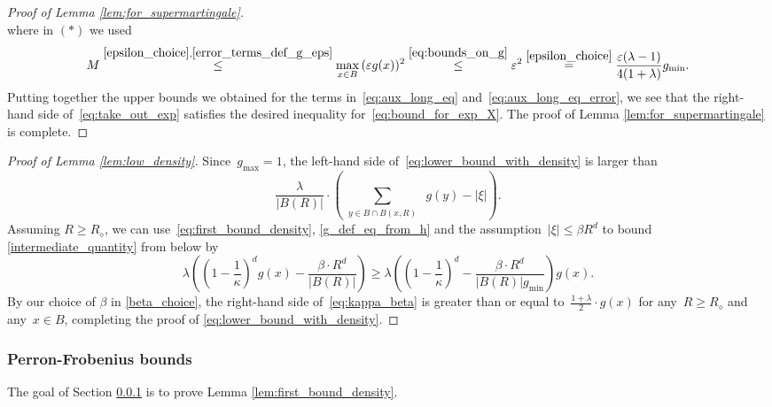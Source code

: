 \documentclass[a4paper,12pt]{article}
\begin{document}
\begin{proof}[Proof of Lemma \ref{lem:for_supermartingale}]
\begin{equation}
\end{equation}
where in  $(*)$ we used
\begin{equation*}
 M \stackrel{\eqref{epsilon_choice}, \eqref{error_terms_def_g_eps} }{\leq} \max_{x \in B}\, ( \varepsilon g(x) )^2 \stackrel{\eqref{eq:bounds_on_g} }{\leq} \varepsilon^2
 \stackrel{\eqref{epsilon_choice}}{=} \frac{\varepsilon(\lambda-1)}{4(1+\lambda)}g_{\min}.
\end{equation*}
Putting together the upper bounds  we obtained for the terms in~\eqref{eq:aux_long_eq} and~\eqref{eq:aux_long_eq_error}, we see that the right-hand side of~\eqref{eq:take_out_exp}  satisfies the desired inequality for~\eqref{eq:bound_for_exp_X}.
The proof of Lemma \ref{lem:for_supermartingale} is complete.
\end{proof}



\begin{proof}[Proof of Lemma \ref{lem:low_density}]
Since~$g_{\max}= 1$, the left-hand side of~\eqref{eq:lower_bound_with_density} is larger than
\begin{equation}\label{intermediate_quantity}
\frac{\lambda}{|B(R)|}\cdot \left( \sum_{\substack{y \in B \cap B(x,R)}}\;  g(y) - |\xi| \right).
\end{equation}
Assuming $R \ge R_\diamond$, we can use~\eqref{eq:first_bound_density}, \eqref{g_def_eq_from_h} and the assumption~$|\xi| \leq \beta R^d$ to bound \eqref{intermediate_quantity} from below by
\begin{equation} \label{eq:kappa_beta}
\lambda \left(\left(1-\frac{1}{\kappa}\right)^d  g(x) - \frac{ \beta \cdot R^d}{|B(R)|} \right) \geq \lambda \left(\left(1- \frac{1}{\kappa}\right)^d - \frac{\beta \cdot R^d}{|B(R)|  g_{\min}}\right)  g(x).
\end{equation}
By our choice of $\beta$ in \eqref{beta_choice}, the right-hand side of~\eqref{eq:kappa_beta} is greater than or equal to~$\frac{1+\lambda}{2}\cdot g(x)$ for any~$R \ge R_\diamond$ and any~$x \in B$, completing the proof of \eqref{eq:lower_bound_with_density}.
\end{proof}






\subsubsection{Perron-Frobenius bounds}
\label{subsubsection_perron}

The goal of Section \ref{subsubsection_perron} is to prove Lemma \ref{lem:first_bound_density}.
\end{document}
